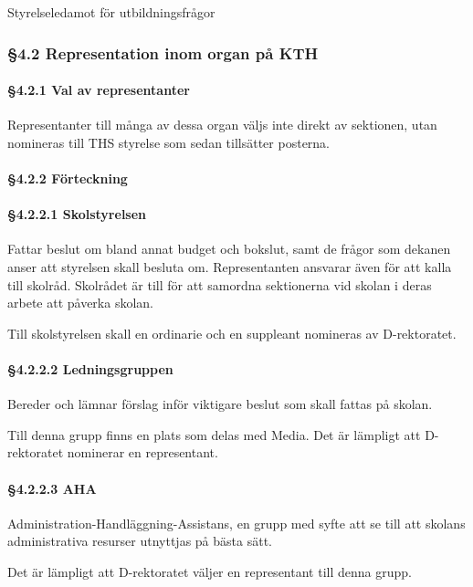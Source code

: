Styrelseledamot för utbildningsfrågor

\subsubsection{§4.2 Representation inom organ på KTH}

\paragraph{§4.2.1 Val av representanter}

Representanter till många av dessa organ väljs inte direkt av sektionen, utan nomineras till THS styrelse som sedan tillsätter posterna.

\paragraph{§4.2.2 Förteckning}

\paragraph{§4.2.2.1 Skolstyrelsen}

Fattar beslut om bland annat budget och bokslut, samt de frågor som dekanen anser att styrelsen skall besluta om. Representanten ansvarar även för att kalla till skolråd. Skolrådet är till för att samordna sektionerna vid skolan i deras arbete att påverka skolan.

Till skolstyrelsen skall en ordinarie och en suppleant nomineras av D-rektoratet.

\paragraph{§4.2.2.2 Ledningsgruppen}

Bereder och lämnar förslag inför viktigare beslut som skall fattas på skolan.

Till denna grupp finns en plats som delas med Media. Det är lämpligt att D-rektoratet nominerar en representant.

\paragraph{§4.2.2.3 AHA}

Administration-Handläggning-Assistans, en grupp med syfte att se till att skolans administrativa resurser utnyttjas på bästa sätt.

Det är lämpligt att D-rektoratet väljer en representant till denna grupp.

